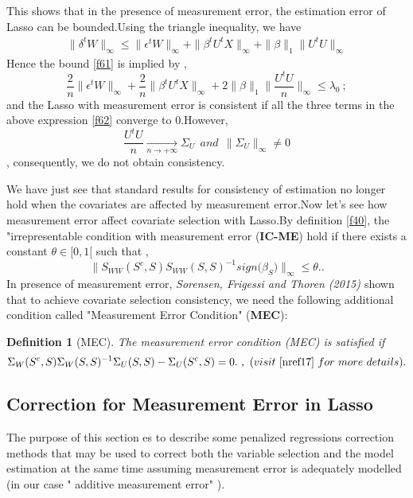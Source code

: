 \documentclass[12pt]{report}
\newtheorem {definition}{Definition}[section] %
\begin{document}
This shows that in the presence of measurement error, the estimation error of Lasso can be bounded.Using the triangle inequality, we have 
\begin{align*}
	\parallel\delta^{t}W\parallel_{\infty}\leq\parallel \epsilon^{t}W\parallel_{\infty}+\parallel\beta^{t}U^{t}X\parallel_{\infty}+\parallel\beta\parallel_{1}\parallel U^{t}U\parallel_{\infty}
\end{align*}
Hence the bound \eqref{f61} is implied by ,
\begin{equation}
	\frac{2}{n}\parallel \epsilon^{t}W\parallel_{\infty}+\frac{2}{n}\parallel\beta^{t}U^{t}X\parallel_{\infty}+2\parallel\beta\parallel_{1}\parallel \frac{U^{t}U}{n}\parallel_{\infty}\leq\lambda_{0}\ ;
	\label{f62}
\end{equation}
and the Lasso with measurement error is consistent if all the three terms in the above expression \eqref{f62} converge to $0$.However, 
$$\frac{U^{t}U}{n}\underset{n \rightarrow +\infty}{\longrightarrow}\Sigma_{U}\ \ and\ \ \parallel\Sigma_{U}\parallel_{\infty} \neq0$$,
consequently, we do not obtain consistency.

We have just see that standard results for consistency of estimation no longer hold when the covariates are affected by measurement error.Now let's see how measurement error affect covariate selection with Lasso.By  definition  \eqref{f40}, the "irrepresentable condition with measurement error (\textbf{IC-ME}) hold if there exists a constant $\theta \in [0,1[$ such that ,
\begin{equation}
	\parallel S_{WW}(S^{c},S)S_{WW}(S,S)^{-1}sign\big(\beta_{S}\big)\parallel_{\infty}\leq \theta.
	\label{f63}.
\end{equation}
In presence of measurement error, \textit{Sorensen, Frigessi and Thoren (2015) \cite{nref17}} shown that to achieve covariate selection consistency, we need the following additional condition called "Measurement Error Condition" (\textbf{MEC}):
\begin{definition}[MEC]
	The measurement error condition (MEC) is satisfied if
	\begin{equation}
		\Sigma_{W}(S^{c},S)\Sigma_{W}(S,S)^{-1}\Sigma_{U}(S,S)-\Sigma_{U}(S^{c},S)=0.\ ,\ (visit\ \cite{nref17}\ for\ more\ details).
	\end{equation}
\end{definition}
\subsection{Correction for Measurement Error in Lasso}
The purpose of this section es to describe some penalized regressions correction methods that may be used to correct both the variable selection and the model estimation at the same time assuming measurement error is adequately modelled (in our case " additive measurement error" ).
\end{document}
